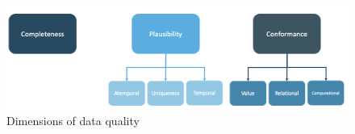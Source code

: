 \begin{figure}[htbp]
\centering
\caption{Dimensions of data quality}\label{fig:categories} 
\includegraphics[scale=0.29]{imgs/data-quality-v1.png}
\end{figure}

